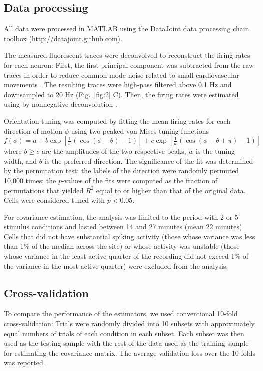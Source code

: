 \subsection*{Data processing}
All data were processed in MATLAB using the DataJoint data processing chain toolbox (http://datajoint.github.com).

The measured fluorescent traces were deconvolved to reconstruct the firing rates for each neuron: First, the first principal component was subtracted from the raw traces in order to reduce common mode noise related to small cardiovascular movements \cite{Cotton:2013}. The resulting traces were high-pass filtered above 0.1 Hz and downsampled to 20 Hz (Fig.~\ref{fig:2} C). Then, the firing rates were estimated using by nonnegative deconvolution \cite{Vogelstein:2010}.

Orientation tuning was computed by fitting the mean firing rates for each direction of motion $\phi$ using two-peaked von Mises tuning functions $f(\phi)=a + b\exp\left[\frac 1 w(\cos(\phi-\theta)-1) \right] + c\exp\left[\frac 1 w(\cos(\phi-\theta+\pi)-1) \right]$ where $b\ge c$ are the amplitudes of the two respective peaks, $w$ is the tuning width, and  $\theta$ is the preferred direction. The significance of the fit was determined by the permutation test: the labels of the direction were randomly permuted 10,000 times; the $p$-values of the fits were computed as the fraction of permutations that yielded $R^2$ equal to or higher than that of the original data.  Cells were considered tuned with $p<0.05$.

For covariance estimation, the analysis was limited to the period with 2 or 5 stimulus conditions and lasted between 14 and 27 minutes (mean 22 minutes).  Cells that did not have substantial spiking activity (those whose variance was less than 1\% of the median across the site) or whose activity was unstable (those whose variance in the least active quarter of the recording did not exceed 1\% of the variance in the most active quarter) were excluded from the analysis.

\subsection*{Cross-validation}
To compare the performance of the estimators, we used conventional 10-fold cross-validation: Trials were randomly divided into 10 subsets with approximately equal numbers of trials of each condition in each subset. Each subset was then used as the testing sample with the rest of the data used as the training sample for estimating the covariance matrix. The average validation loss over the 10 folds was reported.

